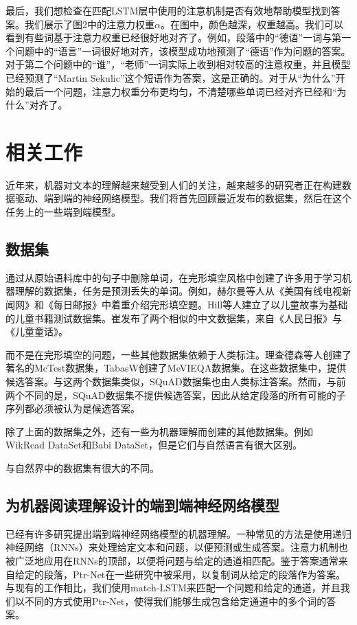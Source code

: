 \documentclass{article}
\begin{document}
\begin{CJK*}{UTF8}{gbsn}
    最后，我们想检查在匹配LSTM层中使用的注意机制是否有效地帮助模型找到答案。我们展示了图2中的注意力权重$\alpha$。在图中，颜色越深，权重越高。我们可以看到有些词基于注意力权重已经很好地对齐了。例如，段落中的“德语”一词与第一个问题中的“语言”一词很好地对齐，该模型成功地预测了“德语”作为问题的答案。对于第二个问题中的“谁”，“老师”一词实际上收到相对较高的注意权重，并且模型已经预测了“Martin Sekulic”这个短语作为答案，这是正确的。对于从“为什么”开始的最后一个问题，注意力权重分布更均匀，不清楚哪些单词已经对齐已经和“为什么”对齐了。

    \section{相关工作}
    近年来，机器对文本的理解越来越受到人们的关注，越来越多的研究者正在构建数据驱动、端到端的神经网络模型。我们将首先回顾最近发布的数据集，然后在这个任务上的一些端到端模型。
    \subsection{数据集}
    通过从原始语料库中的句子中删除单词，在完形填空风格中创建了许多用于学习机器理解的数据集，任务是预测丢失的单词。例如，赫尔曼等人从《美国有线电视新闻网》和《每日邮报》中着重介绍完形填空题。Hill等人建立了以儿童故事为基础的儿童书籍测试数据集。崔发布了两个相似的中文数据集，来自《人民日报》与《儿童童话》。

    而不是在完形填空的问题，一些其他数据集依赖于人类标注。理查德森等人创建了著名的McTest数据集，TabasW创建了MeVIEQA数据集。在这些数据集中，提供候选答案。与这两个数据集类似，SQuAD数据集也由人类标注答案。然而，与前两个不同的是，SQuAD数据集不提供候选答案，因此从给定段落的所有可能的子序列都必须被认为是候选答案。

    除了上面的数据集之外，还有一些为机器理解而创建的其他数据集。例如WikRead DataSet和Babi DataSet，但是它们与自然语言有很大区别。

与自然界中的数据集有很大的不同。

    \subsection{为机器阅读理解设计的端到端神经网络模型}
    已经有许多研究提出端到端神经网络模型的机器理解。一种常见的方法是使用递归神经网络（RNNs）来处理给定文本和问题，以便预测或生成答案。注意力机制也被广泛地应用在RNNs的顶部，以便将问题与给定的通道相匹配。鉴于答案通常来自给定的段落，Ptr-Net在一些研究中被采用，以复制词从给定的段落作为答案。与现有的工作相比，我们使用match-LSTM来匹配一个问题和给定的通道，并且我们以不同的方式使用Ptr-Net，使得我们能够生成包含给定通道中的多个词的答案。


\end{CJK*}
\end{document}
